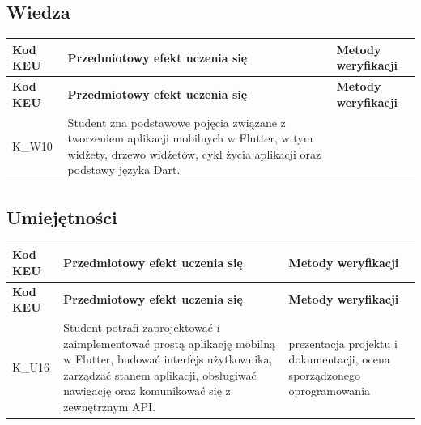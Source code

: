 \documentclass[12pt, a4paper]{article}
\newcommand{\thdrule}{\noalign{\global\setlength{\extrarowheight}{0pt}}}
\newcommand{\thdend}{\noalign{\global\setlength{\extrarowheight}{3pt}}}
\begin{document}
\subsection*{Wiedza}
{\scriptsize
\begin{longtable}{m{1.6cm}m{9.0cm}m{4.2cm}}
\thdrule\toprule
\rowcolor{pjatkRed} {\color{white}\footnotesize\textbf{\vphantom{Ag}Kod KEU}} & {\color{white}\footnotesize\textbf{\vphantom{Ag}Przedmiotowy efekt uczenia się}} & {\color{white}\footnotesize\textbf{\vphantom{Ag}Metody weryfikacji}} \\
\midrule\thdend
\endfirsthead
\thdrule\toprule
\rowcolor{pjatkRed} {\color{white}\footnotesize\textbf{\vphantom{Ag}Kod KEU}} & {\color{white}\footnotesize\textbf{\vphantom{Ag}Przedmiotowy efekt uczenia się}} & {\color{white}\footnotesize\textbf{\vphantom{Ag}Metody weryfikacji}} \\
\midrule\thdend
\endhead
  \rowcolor{tableRowLight} K\_W10 & Student zna podstawowe pojęcia związane z tworzeniem aplikacji mobilnych w Flutter, w tym widżety, drzewo widżetów, cykl życia aplikacji oraz podstawy języka Dart. &  \\
\bottomrule
\end{longtable}}

\subsection*{Umiejętności}
{\scriptsize
\begin{longtable}{m{1.6cm}m{9.0cm}m{4.2cm}}
\thdrule\toprule
\rowcolor{pjatkRed} {\color{white}\footnotesize\textbf{\vphantom{Ag}Kod KEU}} & {\color{white}\footnotesize\textbf{\vphantom{Ag}Przedmiotowy efekt uczenia się}} & {\color{white}\footnotesize\textbf{\vphantom{Ag}Metody weryfikacji}} \\
\midrule\thdend
\endfirsthead
\thdrule\toprule
\rowcolor{pjatkRed} {\color{white}\footnotesize\textbf{\vphantom{Ag}Kod KEU}} & {\color{white}\footnotesize\textbf{\vphantom{Ag}Przedmiotowy efekt uczenia się}} & {\color{white}\footnotesize\textbf{\vphantom{Ag}Metody weryfikacji}} \\
\midrule\thdend
\endhead
  \rowcolor{tableRowLight} K\_U16 & Student potrafi zaprojektować i zaimplementować prostą aplikację mobilną w Flutter, budować interfejs użytkownika, zarządzać stanem aplikacji, obsługiwać nawigację oraz komunikować się z zewnętrznym API. & prezentacja projektu i dokumentacji, ocena sporządzonego oprogramowania \\
\bottomrule
\end{longtable}}
\end{document}

